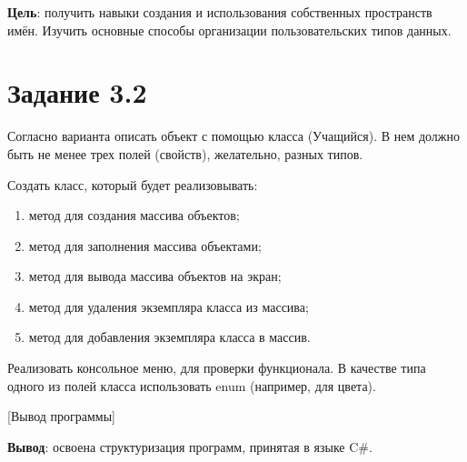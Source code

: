 \documentclass{bsuir}
\newcommand{\csharp}{C{\liberationrm\#}}
\begin{document}

    \textbf{Цель}: получить навыки создания и использования собственных
    пространств имён. Изучить основные способы организации пользовательских
    типов данных.

    \section*{Задание 3.2}

    Согласно варианта описать объект с помощью класса (Учащийся). В нем должно
    быть не менее трех полей (свойств), желательно, разных типов.

    Создать класс, который будет реализовывать:

    \begin{enumerate}
        \item метод для создания массива объектов;
        \item метод для заполнения массива объектами;
        \item метод для вывода массива объектов на экран;
        \item метод для удаления экземпляра класса из массива;
        \item метод для добавления экземпляра класса в массив.
    \end{enumerate}

    Реализовать консольное меню, для проверки функционала. В качестве типа
    одного из полей класса использовать enum (например, для цвета).


    [Вывод программы]

    \textbf{Вывод}: освоена структуризация программ, принятая в языке \csharp.
\end{document}

